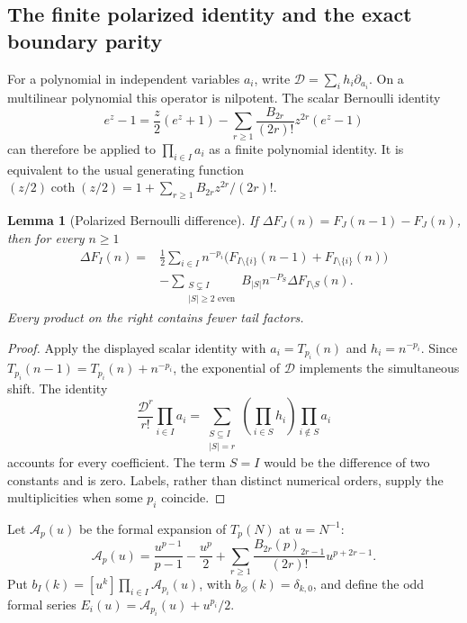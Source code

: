 \documentclass[11pt,letterpaper]{article}
\numberwithin{equation}{section}
\newtheorem{lemma}[theorem]{Lemma}
\theoremstyle{definition}
\theoremstyle{remark}
\begin{document}
\subsection{The finite polarized identity and the exact boundary parity}

For a polynomial in independent variables $a_i$, write
$\mathscr D=\sum_i h_i\partial_{a_i}$. On a multilinear polynomial this
operator is nilpotent. The scalar Bernoulli identity
\[
 e^z-1=\frac z2(e^z+1)
          -\sum_{r\ge1}\frac{B_{2r}}{(2r)!}z^{2r}(e^z-1)
\]
can therefore be applied to $\prod_{i\in I}a_i$ as a finite polynomial
identity. It is equivalent to the usual generating function
$(z/2)\coth(z/2)=1+\sum_{r\ge1}B_{2r}z^{2r}/(2r)!$.

\begin{lemma}[Polarized Bernoulli difference]
\label{mtp:polarized}
If $\Delta F_J(n)=F_J(n-1)-F_J(n)$, then for every $n\ge1$
\begin{equation}\label{mtp:polarized-formula}
 \boxed{\begin{aligned}
 \Delta F_I(n)={}&\frac12\sum_{i\in I}n^{-p_i}
                         \bigl(F_{I\setminus\{i\}}(n-1)
                              +F_{I\setminus\{i\}}(n)\bigr)\\
 &-\sum_{\substack{S\subsetneq I\\|S|\ge2\text{ even}}}
                   B_{|S|}n^{-P_S}\Delta F_{I\setminus S}(n).
 \end{aligned}}
\end{equation}
Every product on the right contains fewer tail factors.
\end{lemma}

\begin{proof}
Apply the displayed scalar identity with
$a_i=T_{p_i}(n)$ and $h_i=n^{-p_i}$. Since
$T_{p_i}(n-1)=T_{p_i}(n)+n^{-p_i}$, the exponential of $\mathscr D$
implements the simultaneous shift. The identity
\[
 \frac{\mathscr D^r}{r!}\prod_{i\in I}a_i
  =\sum_{\substack{S\subseteq I\\|S|=r}}
                  \left(\prod_{i\in S}h_i\right)\prod_{i\notin S}a_i
\]
accounts for every coefficient. The term $S=I$ would be the difference
of two constants and is zero. Labels, rather than distinct numerical
orders, supply the multiplicities when some $p_i$ coincide.
\end{proof}

Let $\mathcal A_p(u)$ be the formal expansion of $T_p(N)$ at $u=N^{-1}$:
\begin{equation}\label{mtp:unshifted}
 \mathcal A_p(u)=\frac{u^{p-1}}{p-1}-\frac{u^p}{2}
       +\sum_{r\ge1}\frac{B_{2r}(p)_{2r-1}}{(2r)!}u^{p+2r-1}.
\end{equation}
Put $b_I(k)=[u^k]\prod_{i\in I}\mathcal A_{p_i}(u)$, with
$b_\varnothing(k)=\delta_{k,0}$, and define the odd formal series
$E_i(u)=\mathcal A_{p_i}(u)+u^{p_i}/2$.
\end{document}
